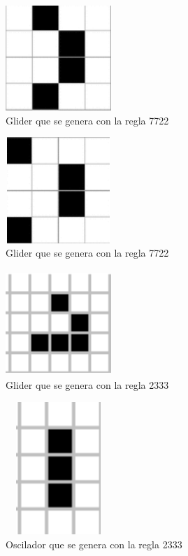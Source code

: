 \begin{figure}[H]
\begin{center}
 \includegraphics[width=4cm, height=4cm]{./img/glider.png}
 \caption{Glider que se genera con la regla 7722}
 \label{fig:glider}
\end{center}
\end{figure}

\begin{figure}[H]
\begin{center}
 \includegraphics[width=4cm, height=4cm]{./img/glider2.png}
 \caption{Glider que se genera con la regla 7722}
 \label{fig:glider2}
\end{center}
\end{figure}

\begin{figure}[H]
\begin{center}
 \includegraphics[width=4cm, height=4cm]{./img/glider3.png}
 \caption{Glider que se genera con la regla 2333}
 \label{fig:glider3}
\end{center}
\end{figure}

\begin{figure}[H]
\begin{center}
 \includegraphics[width=4cm, height=5cm]{./img/oscilador.png}
 \caption{Oscilador que se genera con la regla 2333}
 \label{fig:oscilador}
\end{center}
\end{figure}

